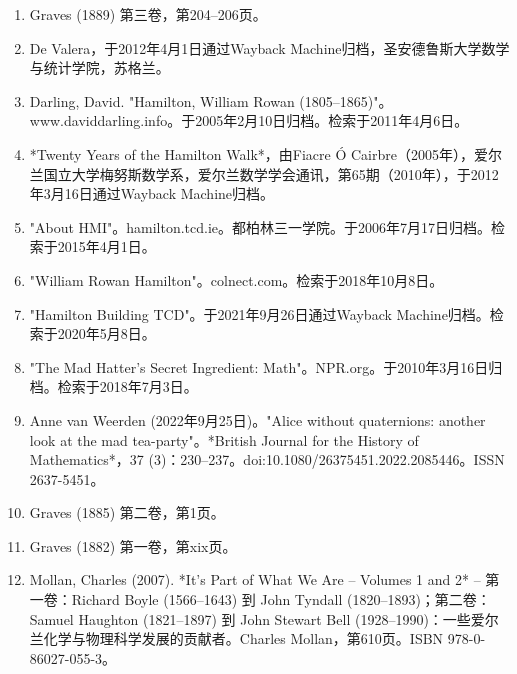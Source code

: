 \begin{enumerate}
\item Graves (1889) 第三卷，第204–206页。  
\item De Valera，于2012年4月1日通过Wayback Machine归档，圣安德鲁斯大学数学与统计学院，苏格兰。  
\item Darling, David. "Hamilton, William Rowan (1805–1865)"。www.daviddarling.info。于2005年2月10日归档。检索于2011年4月6日。  
\item *Twenty Years of the Hamilton Walk*，由Fiacre Ó Cairbre（2005年），爱尔兰国立大学梅努斯数学系，爱尔兰数学学会通讯，第65期（2010年），于2012年3月16日通过Wayback Machine归档。  
\item "About HMI"。hamilton.tcd.ie。都柏林三一学院。于2006年7月17日归档。检索于2015年4月1日。  
\item "William Rowan Hamilton"。colnect.com。检索于2018年10月8日。  
\item "Hamilton Building TCD"。于2021年9月26日通过Wayback Machine归档。检索于2020年5月8日。  
\item "The Mad Hatter's Secret Ingredient: Math"。NPR.org。于2010年3月16日归档。检索于2018年7月3日。  
\item Anne van Weerden (2022年9月25日)。"Alice without quaternions: another look at the mad tea-party"。*British Journal for the History of Mathematics*，37 (3)：230–237。doi:10.1080/26375451.2022.2085446。ISSN 2637-5451。  
\item Graves (1885) 第二卷，第1页。  
\item Graves (1882) 第一卷，第xix页。  
\item Mollan, Charles (2007). *It's Part of What We Are – Volumes 1 and 2* – 第一卷：Richard Boyle (1566–1643) 到 John Tyndall (1820–1893)；第二卷：Samuel Haughton (1821–1897) 到 John Stewart Bell (1928–1990)：一些爱尔兰化学与物理科学发展的贡献者。Charles Mollan，第610页。ISBN 978-0-86027-055-3。
\end{enumerate}
